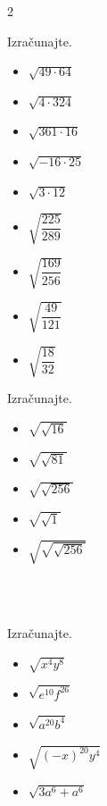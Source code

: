         \begin{multicols}{2}
            

            \begin{naloga}
                Izračunajte.
                \begin{itemize}
                        \item $\sqrt{49\cdot 64}$ 
                        \item $\sqrt{4\cdot 324}$ 
                        \item $\sqrt{361\cdot 16}$ 
                        \item $\sqrt{-16\cdot 25}$ 
                        \item $\sqrt{3\cdot 12}$ 
                        \item $\sqrt{\dfrac{225}{289}}$ 
                        \item $\sqrt{\dfrac{169}{256}}$ 
                        \item $\sqrt{\dfrac{49}{121}}$ 
                        \item $\sqrt{\dfrac{18}{32}}$ 
                \end{itemize}
            \end{naloga}
        

        
            \begin{naloga}
                Izračunajte.
                \begin{itemize}
                        \item $\sqrt{\sqrt{16}}$ 
                        \item $\sqrt{\sqrt{81}}$ 
                        \item $\sqrt{\sqrt{256}}$ 
                        \item $\sqrt{\sqrt{1}}$ 
                        \item $\sqrt{\sqrt{\sqrt{256}}}$ 
                \end{itemize}
            \end{naloga}
        
            ~~\\~
        
            \begin{naloga}
                Izračunajte.
                \begin{itemize}
                        \item $\sqrt{x^4y^8}$ 
                        \item $\sqrt{e^{10}f^{26}}$ 
                        \item $\sqrt{a^{20}b^4}$ 
                        \item $\sqrt{(-x)^{20}y^4}$ 
                        \item $\sqrt{3a^6+a^6}$ 
                \end{itemize}
            \end{naloga}
        



\end{multicols}
